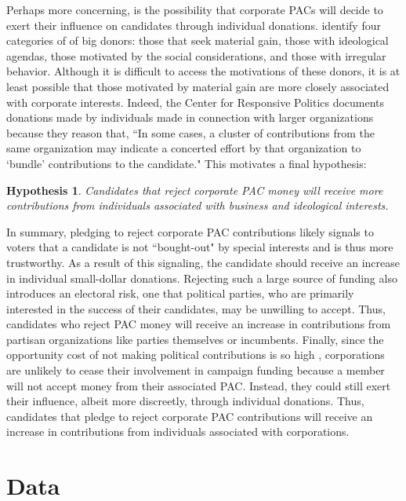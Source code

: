 \documentclass[12pt]{article}
\newtheorem{hyp}{Hypothesis}
\begin{document}
 Perhaps more concerning, is the possibility that corporate PACs will decide to exert their influence on candidates through individual donations. \citet{francia2003} identify four categories of of big donors: those that seek material gain, those with ideological agendas, those motivated by the social considerations, and those with irregular behavior. Although it is difficult to access the motivations of these donors, it is at least possible that those motivated by material gain are more closely associated with corporate interests. Indeed, the Center for Responsive Politics documents donations made by individuals made in connection with larger organizations because they reason that, ``In some cases, a cluster of contributions from the same organization may indicate a concerted effort by that organization to `bundle' contributions to the candidate." This motivates a final hypothesis:
 
 \begin{hyp}
 	Candidates that reject corporate PAC money will receive more contributions from individuals associated with business and ideological interests. 
 \end{hyp}
 
 In summary, pledging to reject corporate PAC contributions likely signals to voters that a candidate is not ``bought-out" by special interests and is thus more trustworthy. As a result of this signaling, the candidate should receive an increase in individual small-dollar donations. Rejecting such a large source of funding also introduces an electoral risk, one that political parties, who are primarily interested in the success of their candidates, may be unwilling to accept. Thus, candidates who reject PAC money will receive an increase in contributions from partisan organizations like parties themselves or incumbents. Finally, since the opportunity cost of not making political contributions is so high \citep{grier1991}, corporations are unlikely to cease their involvement in campaign funding because a member will not accept money from their associated PAC. Instead, they could still exert their influence, albeit more discreetly, through individual donations. Thus, candidates that pledge to reject corporate PAC contributions will receive an increase in contributions from individuals associated with corporations.


\section{Data}
\end{document}
